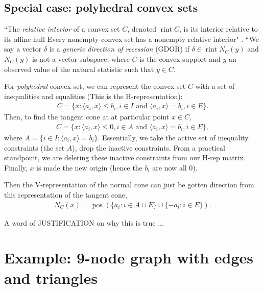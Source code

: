 \documentclass{amsbook}
\DeclareMathOperator{\rintr}{rint}
\DeclareMathOperator{\pos}{pos}
\newcommand{\inner}[1]{\langle #1 \rangle}
\theoremstyle{definition}
\theoremstyle{remark}
\begin{document}
\subsection{Special case: polyhedral convex sets}
``The \emph{relative interior} of a convex set $C$, denoted $\rintr C$, is 
its interior relative to its affine hull Every 
nonempty convex set has a nonempty relative interior" \citep{Geyer:gdor, Rockafellar:1970}.  
``We say a vector $\delta$ is a \emph{generic direction of recession} (GDOR) if $\delta 
\in \rintr N_C(y)$ and $N_C(y)$ is not a vector subspace, where $C$ is the convex 
support and $y$ an observed value of the natural statistic such that $y \in C$.


For \emph{polyhedral} convex set, we can represent the convex set $C$ with a set of 
inequalities and equalities (This is the H-representation):
\begin{align*}
	C = \{ x: \inner{a_i, x} \leq b_i, i \in I \text{ and } \inner{a_i, x} = b_i, i 
\in E \}.
\end{align*}
  Then, to find the tangent cone at at particular point 
$x \in C$, 
\begin{align*}
	C = \{ x: \inner{a_i, x} \leq 0, i \in A \text{ and } \inner{a_i, x} = b_i, i \in 
E \},
\end{align*}
where $A = \{ i \in I: \inner{a_i,x} = b_i\}$.  Essentially, we take the active set of 
inequality constraints (the set $A$), drop the inactive constraints. From a practical standpoint, we are deleting these inactive constraints from our H-rep matrix.  Finally, $x$ is 
made the new origin (hence the $b_i$ are now all 0).

Then the V-representation of the normal cone can just be gotten direction from this 
representation of the tangent cone,
\begin{align*}
	N_C(x) = \pos( \{ a_i: i \in A \cup E\} \cup \{ - a_i: i \in E \} ).
\end{align*}

A word of JUSTIFICATION on why this is true ...

\section{Example: 9-node graph with edges and triangles}
\end{document}
